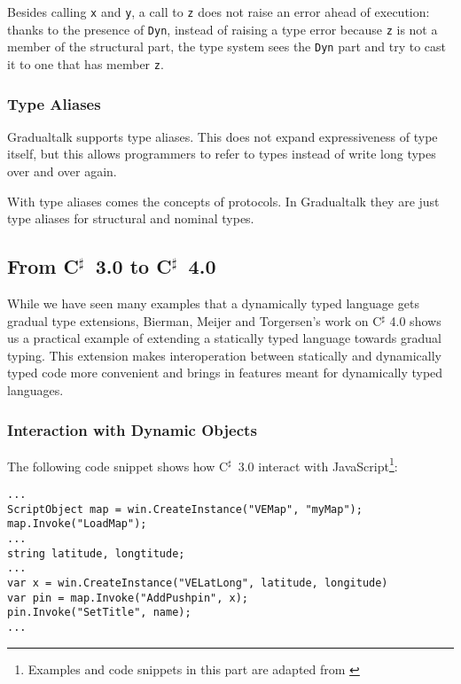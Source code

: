 Besides calling \texttt{x} and \texttt{y}, a call to \texttt{z} does not
raise an error ahead of execution:
thanks to the presence of \texttt{Dyn},
instead of raising a type error because \texttt{z} is not a member
of the structural part, the type system sees the \texttt{Dyn} part
and try to cast it to one that has member \texttt{z}.

\subsubsection{Type Aliases}

Gradualtalk supports type aliases. This does not expand expressiveness of type itself, but this allows programmers to refer to types instead of
write long types over and over again.

With type aliases comes the concepts of protocols.
In Gradualtalk they are just type aliases
for structural and nominal types.

\newcommand{\csharp}{C$^\sharp$}
\subsection{From \csharp\ 3.0 to \csharp\ 4.0}

While we have seen many examples that a dynamically typed language gets
gradual type extensions, Bierman, Meijer and Torgersen's work on
C$^\sharp$ 4.0\cite{meijer2004static} shows us a practical example of
extending a statically typed language towards gradual typing.
This extension makes interoperation between statically and dynamically typed code
more convenient and brings in features meant for dynamically typed languages.

\subsubsection{Interaction with Dynamic Objects}

The following code snippet shows how \csharp\ 3.0
interact with JavaScript\footnote{
Examples and code snippets in this part are
adapted from \cite{meijer2004static}
}:

\begin{verbatim}
...
ScriptObject map = win.CreateInstance("VEMap", "myMap");
map.Invoke("LoadMap");
...
string latitude, longtitude;
...
var x = win.CreateInstance("VELatLong", latitude, longitude)
var pin = map.Invoke("AddPushpin", x);
pin.Invoke("SetTitle", name);
...
\end{verbatim}

